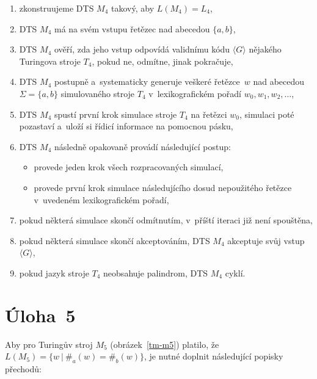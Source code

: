 \documentclass[a4paper, 11pt]{article}
\begin{document}
\begin{enumerate}
    \item zkonstruujeme DTS $M_4$ takový, aby $L\left( M_4 \right) = L_4$,
    \item DTS $M_4$ má na svém vstupu řetězec nad abecedou $\{ a, b \}$,
    \item DTS $M_4$ ověří, zda jeho vstup odpovídá validnímu kódu $\langle G \rangle$ nějakého Turingova stroje $T_4$, pokud ne, odmítne, jinak pokračuje,
    \item DTS $M_4$ postupně a~systematicky generuje veškeré řetězce~$w$ nad abecedou~$\Sigma = \{ a, b \}$ simulovaného stroje $T_4$ v~lexikografickém pořadí $w_0, w_1, w_2, \dots$,
    \item DTS $M_4$ spustí první krok simulace stroje $T_4$ na řetězci $w_0$, simulaci poté pozastaví a~uloží si řídicí informace na pomocnou pásku,
    \item DTS $M_4$ následně opakovaně provádí následující postup:
    \begin{itemize}
        \item provede jeden krok všech rozpracovaných simulací,
        \item provede první krok simulace následujícího dosud nepoužitého řetězce v~uvedeném lexikografickém pořadí,
    \end{itemize}
    \item pokud některá simulace skončí odmítnutím, v~příští iteraci již není spouštěna,
    \item pokud některá simulace skončí akceptováním, DTS $M_4$ akceptuje svůj vstup $\langle G \rangle$,
    \item pokud jazyk stroje $T_4$ neobsahuje palindrom, DTS $M_4$ cyklí.
\end{enumerate}

\newpage

\section*{Úloha~5}

Aby pro Turingův stroj $M_5$ (obrázek~\ref{tm-m5}) platilo, že $L\left( M_5 \right) = \{ w\ |\ \#_a\left( w \right) = \#_b\left( w \right) \}$, je nutné doplnit následující popisky přechodů:
\end{document}
